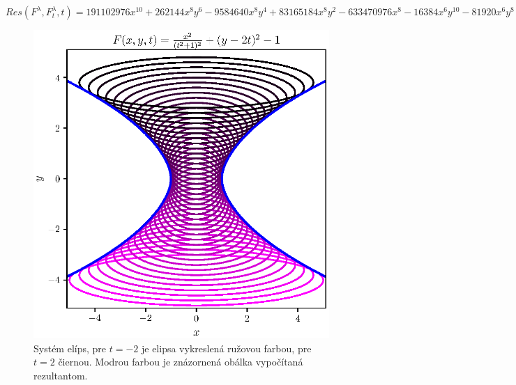 $ Res(F^\lambda , F_t^\lambda , t) = 191102976x^{10} + 262144x^8y^6 - 9584640x^8y^4 + 83165184x^8y^2 - 633470976x^8 - 16384x^6y^{10} - 81920x^6y^8 - 14483456x^6y^6 - 113311744x^6y^4 + 96419840x^6y^2 + 698368000x^6 - 16384x^4y^{12} - 294912x^4y^{10} - 2998272x^4y^8 - 18284544x^4y^6 - 74956800x^4y^4 - 184320000x^4y^2 - 256000000x^4. $
\begin{figure}[h]
	\centering
	\includegraphics{images/resultant.eps}
	\caption[Obálka nájdená pomocou rezultantu.]{Systém elíps, pre $t=-2$ je elipsa vykreslená ružovou farbou, pre $t=2$ čiernou. Modrou farbou je znázornená obálka vypočítaná rezultantom.}
	\label{fig:too_complicated_equations}
\end{figure}
